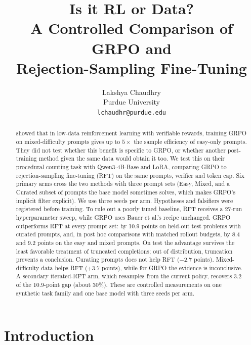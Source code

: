 \documentclass{article}
\title{Is it RL or Data?\\ A Controlled Comparison of GRPO and\\ Rejection-Sampling Fine-Tuning}
\author{Lakshya Chaudhry \\
Purdue University \\
\texttt{lchaudhr@purdue.edu}}
\begin{document}
\maketitle
{}

\begin{abstract}
\citet{bauer2026} showed that in low-data reinforcement learning with verifiable rewards, training GRPO on mixed-difficulty prompts gives up to $5\times$ the sample efficiency of easy-only prompts. They did not test whether this benefit is specific to GRPO, or whether another post-training method given the same data would obtain it too. We test this on their procedural counting task with Qwen3-4B-Base and LoRA, comparing GRPO to rejection-sampling fine-tuning (RFT) on the same prompts, verifier and token cap. Six primary arms cross the two methods with three prompt sets (Easy, Mixed, and a Curated subset of prompts the base model sometimes solves, which makes GRPO’s implicit filter explicit). We use three seeds per arm. Hypotheses and falsifiers were registered before training. To rule out a poorly tuned baseline, RFT receives a 27-run hyperparameter sweep, while GRPO uses Bauer et al.'s recipe unchanged. GRPO outperforms RFT at every prompt set: by 10.9 points on held-out test problems with curated prompts, and, in post hoc comparisons with matched rollout budgets, by 8.4 and 9.2 points on the easy and mixed prompts. On test the advantage survives the least favorable treatment of truncated completions; out of distribution, truncation prevents a conclusion. Curating prompts does not help RFT ($-2.7$ points). Mixed-difficulty data helps RFT (+3.7 points), while for GRPO the evidence is inconclusive. A secondary iterated-RFT arm, which resamples from the current policy, recovers 3.2 of the 10.9-point gap (about 30\%). These are controlled measurements on one synthetic task family and one base model with three seeds per arm.
\end{abstract}

\section{Introduction}
\label{sec:intro}
\end{document}
